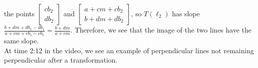 {the points $\left[\begin{array}{c}  cb_2\\ db_2  \end{array} \right]$ and $\left[\begin{array}{c} a+cm+cb_2\\ b+dm+db_2  \end{array} \right]$, so $T(\ell_2)$ has slope $\frac{b+dm+db_1-db_1}{a+cm+cb_1-cb_1}=\frac{b+dm}{a+cm}$.  Therefore, we see that the image of the two lines have the same slope.\\

At time 2:12 in the video, we see an example of perpendicular lines not remaining perpendicular after a transformation.}

\endedxproblem

\endedxvertical










